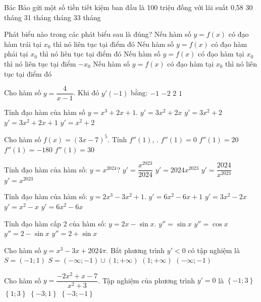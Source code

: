 \begin{ex}
Bác Bảo gửi một số tiền tiết kiệm ban đầu là 100 triệu đồng với lãi suất 0{,}58%
\choice
{30 tháng}
{31 tháng}
{ tháng}
{33 tháng}
\end{ex}
\begin{ex}
Phát biểu nào trong các phát biểu sau là đúng?
\choice
{Nếu hàm số $y=f(x)$ có đạo hàm trái tại $x_0$ thì nó liên tục tại điểm đó}
{Nếu hàm số $y=f(x)$ có đạo hàm phải tại $x_0$ thì nó liên tục tại điểm đó}
{Nếu hàm số $y=f(x)$ có đạo hàm tại $x_0$ thì nó liên tục tại điểm $-x_0$}
{\True Nếu hàm số $y=f(x)$ có đạo hàm tại $x_0$ thì nó liên tục tại điểm đó}
\end{ex}
\begin{ex}
Cho hàm số $y=\dfrac{4}{x-1}$. Khi đó $y'(-1)$ bằng:
\choice
{\True $-1$}
{$-2$}
{$2$}
{$1$}
\end{ex}
\begin{ex}
Tính đạo hàm của hàm số $y=x^3+2x+1$.
\choice
{$y'=3x^2+2x$}
{\True $y'=3x^2+2$}
{$y'=3x^2+2x+1$}
{$y'=x^2+2$}
\end{ex}
\begin{ex}
Cho hàm số $f(x)={{(3x-7)}^5}$. Tính $f''(1)$, .
\choice
{$f''(1) = 0$}
{$f''(1) = 20$}
{\True $f''(1) =-180$}
{$f''(1) =30$}
\end{ex}
\begin{ex}
Tính đạo hàm của hàm số: $y={x^{2024}}$?
\choice
{${y'}=\dfrac{{x^{2023}}}{2024}$}
{\True ${y'}=2024{x^{2023}}$}
{${y'}=\dfrac{2024}{{x^{2023}}}$}
{${y'}={x^{2023}}$}
\end{ex}
\begin{ex}
Tính đạo hàm của hàm số: $y=2x^3-3x^2+1$.
\choice
{${y'}=6x^2-6x+1$}
{${y'}=3x^2-2x$}
{${y'}=x^2-x$}
{\True ${y'}=6x^2-6x$}
\end{ex}
\begin{ex}
Tính đạo hàm cấp 2 của hàm số: $y=2x-\sin x$.
\choice
{\True $y''=\sin x$}
{$y''=\cos x$}
{$y''=2-\sin x$}
{$y''=2+\sin x$}
\end{ex}
\begin{ex}
Cho hàm số $y=x^3-3x+2024\pi $. Bất phương trình $y'<0$ có tập nghiệm là
\choice
{\True $S=(-1;1)$}
{$S=\left(-\infty ;-1\right)\cup \left(1;+\infty\right)$}
{$\left(1;+\infty\right)$}
{$\left(-\infty ;-1\right)$}
\end{ex}
\begin{ex}
Cho hàm số $y=\dfrac{-2x^2+x-7}{x^2+3}$. Tập nghiệm của phương trình $y'=0$ là
\choice
{\True $\left\{ -1;3 \right\}$}
{$\left\{ 1;3 \right\}$}
{$\left\{ -3;1 \right\}$}
{$\left\{ -3;-1 \right\}$}
\end{ex}
